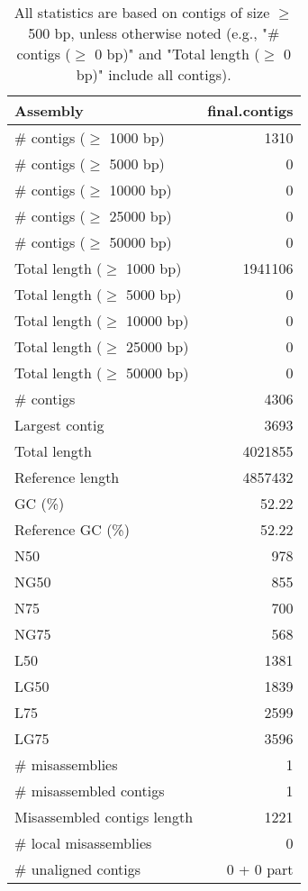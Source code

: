\documentclass[12pt,a4paper]{article}
\begin{document}
\begin{table}[ht]
\begin{center}
\caption{All statistics are based on contigs of size $\geq$ 500 bp, unless otherwise noted (e.g., "\# contigs ($\geq$ 0 bp)" and "Total length ($\geq$ 0 bp)" include all contigs).}
\begin{tabular}{|l*{1}{|r}|}
\hline
Assembly & final.contigs \\ \hline
\# contigs ($\geq$ 1000 bp) & 1310 \\ \hline
\# contigs ($\geq$ 5000 bp) & 0 \\ \hline
\# contigs ($\geq$ 10000 bp) & 0 \\ \hline
\# contigs ($\geq$ 25000 bp) & 0 \\ \hline
\# contigs ($\geq$ 50000 bp) & 0 \\ \hline
Total length ($\geq$ 1000 bp) & 1941106 \\ \hline
Total length ($\geq$ 5000 bp) & 0 \\ \hline
Total length ($\geq$ 10000 bp) & 0 \\ \hline
Total length ($\geq$ 25000 bp) & 0 \\ \hline
Total length ($\geq$ 50000 bp) & 0 \\ \hline
\# contigs & 4306 \\ \hline
Largest contig & 3693 \\ \hline
Total length & 4021855 \\ \hline
Reference length & 4857432 \\ \hline
GC (\%) & 52.22 \\ \hline
Reference GC (\%) & 52.22 \\ \hline
N50 & 978 \\ \hline
NG50 & 855 \\ \hline
N75 & 700 \\ \hline
NG75 & 568 \\ \hline
L50 & 1381 \\ \hline
LG50 & 1839 \\ \hline
L75 & 2599 \\ \hline
LG75 & 3596 \\ \hline
\# misassemblies & 1 \\ \hline
\# misassembled contigs & 1 \\ \hline
Misassembled contigs length & 1221 \\ \hline
\# local misassemblies & 0 \\ \hline
\# unaligned contigs & 0 + 0 part \\ \hline

\end{tabular}
\end{center}
\end{table}
\end{document}
